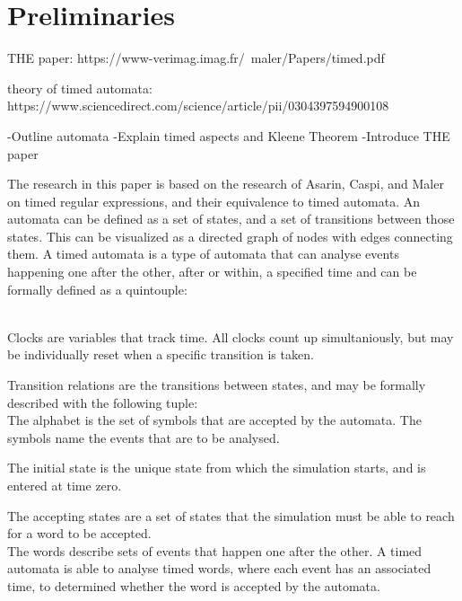 \section{Preliminaries}

THE paper: https://www-verimag.imag.fr/~maler/Papers/timed.pdf

theory of timed automata: https://www.sciencedirect.com/science/article/pii/0304397594900108


-Outline automata
-Explain timed aspects and Kleene Theorem
-Introduce THE paper


The research in this paper is based on the research of Asarin, Caspi, and Maler \cite{asarin1998timed} on timed regular expressions, and their equivalence to timed automata.
An automata can be defined as a set of states, and a set of transitions between those states. This can be visualized as a directed graph of nodes with edges connecting them.
A timed automata is a type of automata that can analyse events happening one after the other, after or within, a specified time and can be formally defined as a quintouple:

\\

Clocks are variables that track time. All clocks count up simultaniously, but may be individually reset when a specific transition is taken.

Transition relations are the transitions between states, and may be formally described with the following tuple:
\\

The alphabet is the set of symbols that are accepted by the automata. The symbols name the events that are to be analysed.

The initial state is the unique state from which the simulation starts, and is entered at time zero.

The accepting states are a set of states that the simulation must be able to reach for a word to be accepted.\\

The words describe sets of events that happen one after the other. A timed automata is able to analyse timed words, where each event has an associated time, to determined whether the word is accepted by the automata.


